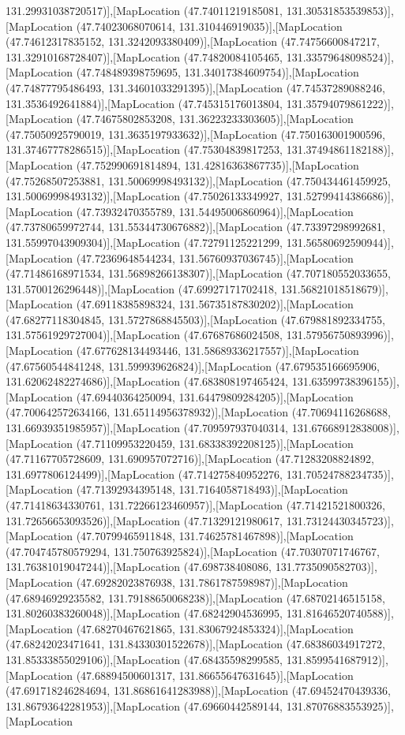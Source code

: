 131.29931038720517)],[MapLocation (47.74011219185081, 131.30531853539853)],[MapLocation (47.74023068070614, 131.310446919035)],[MapLocation (47.74612317835152, 131.3242093380409)],[MapLocation (47.74756600847217, 131.32910168728407)],[MapLocation (47.74820084105465, 131.33579648098524)],[MapLocation (47.748489398759695, 131.34017384609754)],[MapLocation (47.74877795486493, 131.34601033291395)],[MapLocation (47.74537289088246, 131.3536492641884)],[MapLocation (47.745315176013804, 131.35794079861222)],[MapLocation (47.74675802853208, 131.36223233303605)],[MapLocation (47.75050925790019, 131.3635197933632)],[MapLocation (47.750163001900596, 131.37467778286515)],[MapLocation (47.75304839817253, 131.37494861182188)],[MapLocation (47.752990691814894, 131.42816363867735)],[MapLocation (47.75268507253881, 131.50069998493132)],[MapLocation (47.750434461459925, 131.50069998493132)],[MapLocation (47.75026133349927, 131.52799414386686)],[MapLocation (47.73932470355789, 131.54495006860964)],[MapLocation (47.73780659972744, 131.55344730676882)],[MapLocation (47.73397298992681, 131.55997043909304)],[MapLocation (47.72791125221299, 131.56580692590944)],[MapLocation (47.72369648544234, 131.56760937036745)],[MapLocation (47.71486168971534, 131.56898266138307)],[MapLocation (47.707180552033655, 131.5700126296448)],[MapLocation (47.69927171702418, 131.56821018518679)],[MapLocation (47.69118385898324, 131.56735187830202)],[MapLocation (47.68277118304845, 131.5727868845503)],[MapLocation (47.679881892334755, 131.57561929727004)],[MapLocation (47.67687686024508, 131.57956750893996)],[MapLocation (47.677628134493446, 131.58689336217557)],[MapLocation (47.67560544841248, 131.599939626824)],[MapLocation (47.679535166695906, 131.62062482274686)],[MapLocation (47.683808197465424, 131.63599738396155)],[MapLocation (47.69440364250094, 131.64479809284205)],[MapLocation (47.700642572634166, 131.65114956378932)],[MapLocation (47.70694116268688, 131.66939351985957)],[MapLocation (47.709597937040314, 131.67668912838008)],[MapLocation (47.71109953220459, 131.68338392208125)],[MapLocation (47.71167705728609, 131.690957072716)],[MapLocation (47.71283208824892, 131.6977806124499)],[MapLocation (47.714275840952276, 131.70524788234735)],[MapLocation (47.71392934395148, 131.7164058718493)],[MapLocation (47.71418634330761, 131.72266123460957)],[MapLocation (47.71421521800326, 131.72656653093526)],[MapLocation (47.71329121980617, 131.73124430345723)],[MapLocation (47.70799465911848, 131.74625781467898)],[MapLocation (47.704745780579294, 131.750763925824)],[MapLocation (47.70307071746767, 131.76381019047244)],[MapLocation (47.698738408086, 131.7735090582703)],[MapLocation (47.69282023876938, 131.7861787598987)],[MapLocation (47.68946929235582, 131.79188650068238)],[MapLocation (47.68702146515158, 131.80260383260048)],[MapLocation (47.68242904536995, 131.81646520740588)],[MapLocation (47.68270467621865, 131.83067924853324)],[MapLocation (47.68242023471641, 131.84330301522678)],[MapLocation (47.68386034917272, 131.85333855029106)],[MapLocation (47.68435598299585, 131.8599541687912)],[MapLocation (47.68894500601317, 131.86655647631645)],[MapLocation (47.691718246284694, 131.86861641283988)],[MapLocation (47.69452470439336, 131.86793642281953)],[MapLocation (47.69660442589144, 131.87076883553925)],[MapLocation 